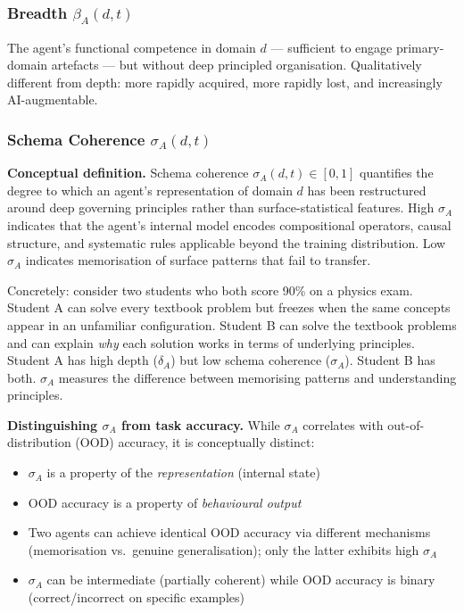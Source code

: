 \documentclass[11pt,a4paper]{article}
\begin{document}
\subsubsection{Breadth \texorpdfstring{$\beta_A(d,t)$}{beta\_A(d,t)}}\label{sec:breadth}

The agent's functional competence in domain $d$ --- sufficient to
engage primary-domain artefacts --- but without deep principled
organisation. Qualitatively different from depth: more rapidly acquired,
more rapidly lost, and increasingly AI-augmentable.

\subsubsection{Schema Coherence \texorpdfstring{$\sigma_A(d,t)$}{sigma\_A(d,t)}}\label{sec:schema-coherence}

\textbf{Conceptual definition.} Schema coherence $\sigma_A(d,t) \in [0,1]$
quantifies the degree to which an agent's representation of domain $d$
has been restructured around deep governing principles rather than
surface-statistical features. High $\sigma_A$ indicates that the agent's
internal model encodes compositional operators, causal structure, and
systematic rules applicable beyond the training distribution. Low
$\sigma_A$ indicates memorisation of surface patterns that fail to
transfer.

Concretely: consider two students who both score 90\% on a physics exam. Student A can solve every textbook problem but freezes when the same concepts appear in an unfamiliar configuration. Student B can solve the textbook problems and can explain \emph{why} each solution works in terms of underlying principles. Student A has high depth ($\delta_A$) but low schema coherence ($\sigma_A$). Student B has both. $\sigma_A$ measures the difference between memorising patterns and understanding principles.

\textbf{Distinguishing $\sigma_A$ from task accuracy.} While $\sigma_A$
correlates with out-of-distribution (OOD) accuracy, it is conceptually
distinct:
\begin{itemize}[nosep]
\item $\sigma_A$ is a property of the \textit{representation} (internal state)
\item OOD accuracy is a property of \textit{behavioural output}
\item Two agents can achieve identical OOD accuracy via different mechanisms (memorisation vs.\ genuine generalisation); only the latter exhibits high $\sigma_A$
\item $\sigma_A$ can be intermediate (partially coherent) while OOD accuracy is binary (correct/incorrect on specific examples)
\end{itemize}
\end{document}
